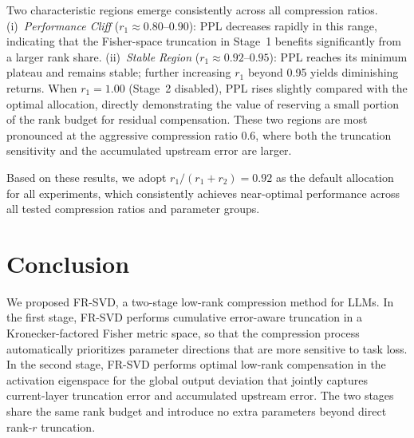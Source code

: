 \documentclass[a4paper,fleqn]{cas-dc}
\begin{document}
Two characteristic regions emerge consistently across all compression ratios.
(i)~\emph{Performance Cliff} ($r_1\!\approx\!0.80$--$0.90$): PPL decreases rapidly in
this range, indicating that the Fisher-space truncation in Stage~1 benefits significantly
from a larger rank share.
(ii)~\emph{Stable Region} ($r_1\!\approx\!0.92$--$0.95$): PPL reaches its minimum plateau
and remains stable; further increasing $r_1$ beyond 0.95 yields diminishing returns.
When $r_1=1.00$ (Stage~2 disabled), PPL rises slightly compared with the optimal
allocation, directly demonstrating the value of reserving a small portion of the rank
budget for residual compensation.
These two regions are most pronounced at the aggressive compression ratio 0.6, where both
the truncation sensitivity and the accumulated upstream error are larger.

Based on these results, we adopt $r_1/(r_1{+}r_2)=0.92$ as the default allocation for all
experiments, which consistently achieves near-optimal performance across all tested
compression ratios and parameter groups.



\section{Conclusion}

We proposed FR-SVD, a two-stage low-rank compression method for LLMs. In the first stage, FR-SVD performs cumulative error-aware truncation in a Kronecker-factored Fisher metric space, so that the compression process automatically prioritizes parameter directions that are more sensitive to task loss. In the second stage, FR-SVD performs optimal low-rank compensation in the activation eigenspace for the global output deviation that jointly captures current-layer truncation error and accumulated upstream error. The two stages share the same rank budget and introduce no extra parameters beyond direct rank-$r$ truncation.
\end{document}
